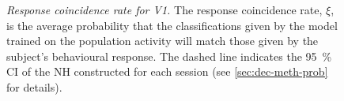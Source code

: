 \begin{figure}[htbp]
    \centering
    \hspace*{\fill}
    \hspace*{\fill}\hspace{.2cm}\hspace*{\fill}
    \hspace*{\fill}
    \caption{%
    \textit{Response coincidence rate for \ac{V1}.}
    The response coincidence rate, $\xi$, is the average probability that the classifications given by the model trained on the population activity will match those given by the subject's behavioural response.
    The dashed line indicates the \SI{95}{\percent} \acf{CI} of the \acf{NH} constructed for each session (see \autoref{sec:dec-meth-prob} for details).
}
    \label{fig:decag_all_v1}
\end{figure}


